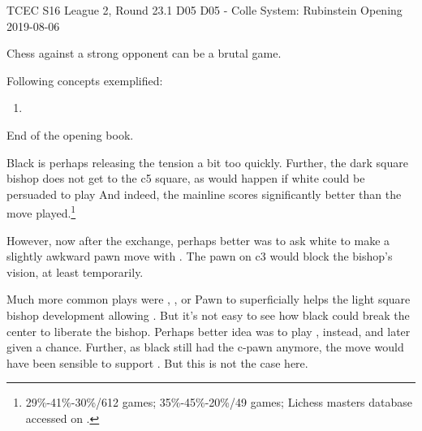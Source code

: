 
%
          {TCEC S16 League 2, Round 23.1}%
          {D05 D05 - Colle System: Rubinstein Opening}%
          {2019-08-06}

Chess against a strong opponent can be a brutal game.

Following concepts exemplified:
\begin{enumerate}
\item
\end{enumerate}



End of the opening book.


Black is perhaps releasing the tension a bit too quickly. Further, the
dark square bishop does not get to the c5 square, as would happen if
white could be persuaded to play  And indeed, the
mainline  scores significantly better than the move
played.\footnote{ 29\%-41\%-30\%/612
games;  35\%-45\%-20\%/49 games; Lichess masters
database accessed on .}


However, now after the exchange, perhaps better was to ask white to
make a slightly awkward pawn move with . The
pawn on c3 would block the bishop's vision, at least temporarily.


Much more common plays were , , or 
Pawn to  superficially helps the light square bishop
development allowing . But it's not easy to see how black
could break the center to liberate the bishop. Perhaps better idea was
to play , instead, and  later given a
chance. Further, as black still had the c-pawn anymore, the move would
have been sensible to support . But this is not the case
here.

